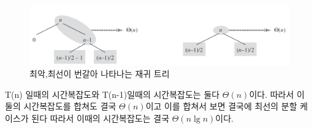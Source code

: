 \begin{figure}[h!]
    \centering
    \includegraphics[scale=0.5]{./QuickSort/pic/q3.png}
    \caption{최악,최선이 번갈아 나타나는 재귀 트리\cite{reference1}}
\end{figure}

T(n) 일때의 시간복잡도와 T(n-1)일때의 시간복잡도는 둘다 $\Theta(n)$이다. 따라서 이 둘의 시간복잡도를 합쳐도 결국 $\Theta(n)$이고 이를 합쳐서 보면 결국에 최선의 분할 케이스가 된다 따라서 이때의 시간복잡도는 결국 $\Theta(n \lg n)$이다.
